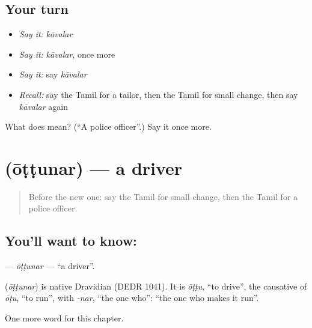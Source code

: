 \subsection*{Your turn}
\begin{itemize}
\raggedright
  \item \emph{Say it:} \emph{kāvalar}
  \item \emph{Say it:} \emph{kāvalar}, once more
  \item \emph{Say it:} say \emph{kāvalar}
  \item \emph{Recall:} say the Tamil for a tailor, then the Tamil for small change, then say \emph{kāvalar} again
\end{itemize}

\begin{tcolorbox}[breakable,colback=teal!4,colframe=teal!35!black,title={Before you move on}]
What does  mean? (\textquotedblleft{}A police officer\textquotedblright{}.) Say it once more.
\end{tcolorbox}
\section[\texorpdfstring{\ta{ஓட்டுநர்} (ōṭṭunar)}{ஓட்டுநர் (ōṭṭunar)}]{ (ōṭṭunar) — a driver}

\label{lesson:TA-C192-ottunar}



\begin{quote}
Before the new one: say the Tamil for small change, then the Tamil for a police officer.
\end{quote}

\subsection*{You'll want to know: }
\textbf{} — \emph{ōṭṭunar} — \textquotedblleft{}a driver\textquotedblright{}.

\begin{cousinweb}
\textbf{} (\emph{ōṭṭunar}) is native Dravidian (DEDR 1041). It is \emph{ōṭṭu}, \textquotedblleft{}to drive\textquotedblright{}, the causative of \emph{ōṭu}, \textquotedblleft{}to run\textquotedblright{}, with \emph{-nar}, \textquotedblleft{}the one who\textquotedblright{}: \textquotedblleft{}the one who makes it run\textquotedblright{}.
\end{cousinweb}

\begin{grammarlens}[title={What you've built}]
One more word for this chapter.
\end{grammarlens}

